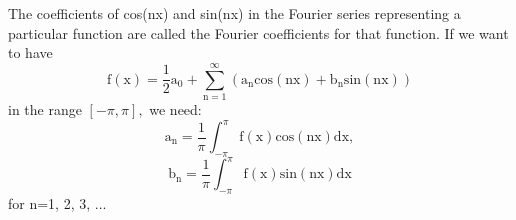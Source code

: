 The coefficients of cos(nx) and sin(nx) in the Fourier series
representing a particular function are called the Fourier
coefficients for that function. If we want to have
\[ \mathrm{f(x)} = \frac{1}{2} \mathrm{a}_0 +
\sum _{\mathrm{n}=1} ^{\infty} 
( \mathrm{a}_{\mathrm{n}} \mathrm{cos(nx)}
+ \mathrm{b}_{\mathrm{n}} \mathrm{sin(nx)} ) \]
in the range $ [ - \pi , \pi ] , $ we need:
\[ \mathrm{a}_{\mathrm{n}} =
\frac{1}{\pi} \int _{- \pi} ^{\pi}
\mathrm{f(x)cos(nx)dx} , \]
\[ \mathrm{b}_{\mathrm{n}} =
\frac{1}{\pi} \int _{- \pi} ^{\pi}
\mathrm{f(x)sin(nx)dx} \]
for n=1, 2, 3, ...